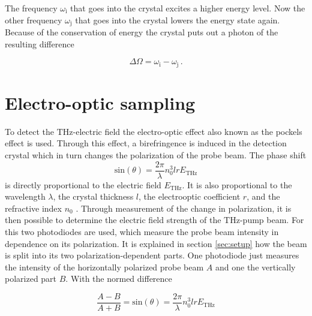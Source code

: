 The frequency $\omega_\text{i}$ that goes into the crystal excites a higher energy level.
Now the other frequency $\omega_\text{j}$ that goes into the crystal lowers the energy state again.
Because of the conservation of energy the crystal puts out a photon of the resulting difference

\begin{equation}
    \Delta\Omega = \omega_\text{i} - \omega_\text{j} \, .
\end{equation}





\section{Electro-optic sampling}\label{sec:eos}
To detect the $\si{\tera\hertz}$-electric field the electro-optic effect also known as the pockels effect is used.
Through this effect, a birefringence is induced in the detection crystal which in turn changes the polarization of the probe beam.
The phase shift 
\begin{equation}
    \text{sin}(\theta) = \frac{2\pi}{\lambda} n_0^3 l r E_\text{THz}
\end{equation}
is directly proportional to the electric field $E_\text{THz}$. 
It is also proportional to the wavelength $\lambda$, the crystal thickness $l$, the electrooptic coefficient $r$, and the refractive index $n_0$ \cite{wiki_book}. 
Through measurement of the change in polarization, it is then possible to determine the electric field strength of the $\si{\tera\hertz}$-pump beam.
For this two photodiodes are used, which measure the probe beam intensity in dependence on its polarization.
It is explained in section \ref{sec:setup} how the beam is split into its two polarization-dependent parts.
One photodiode just measures the intensity of the horizontally polarized probe beam $A$ and one the vertically polarized part $B$.
With the normed difference 

\begin{equation}
    \frac{A-B}{A+B} = \text{sin}(\theta) = \frac{2\pi}{\lambda} n_0^3 l r E_\text{THz}
    \label{eq:electricfield_A_B}
\end{equation}

